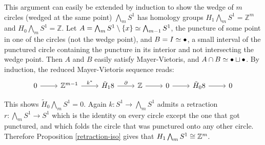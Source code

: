 \begin{example}
This argument can easily be extended by induction to show the wedge of $m$ circles (wedged at the same point) $\bigwedge_m S^1$ has homology groups $H_1\bigwedge_m S^1=\mathbb{Z}^m$ and $H_0\bigwedge_m S^1=\mathbb{Z}$. Let $A=\bigwedge_{m} S^1\setminus\{x\}\simeq \bigwedge_{m-1} S^1$, the puncture of some point in one of the circles (not the wedge point), and $B=I\simeq \bullet$, a small interval of the punctured circle containing the puncture in its interior and not intersecting the wedge point. Then $A$ and $B$ easily satisfy Mayer-Vietoris, and $A\cap B\simeq \bullet \sqcup \bullet$. By induction, the reduced Mayer-Vietoris sequence reads:
\[\begin{tikzcd}
0 \arrow[r] & \mathbb{Z}^{m-1} \arrow[r, "k^*"] & \tilde{H}_18 \arrow[r, "\partial"] & \mathbb{Z} \arrow[r] & 0 \arrow[r] & \tilde{H}_08 \arrow[r] & 0
\end{tikzcd}\]

This shows $\tilde{H}_0 \bigwedge_m S^1=0$. Again  $k:S^1\rightarrow \bigwedge_m S^1$ admits a retraction $r:\bigwedge_m S^1\rightarrow S^1$ which is the identity on every circle except the one that got punctured, and which folds the circle that was punctured onto any other circle. Therefore Proposition \ref{retraction-iso} gives that $H_1 \bigwedge_m S^1\cong \mathbb{Z}^{m}$.
\end{example}

